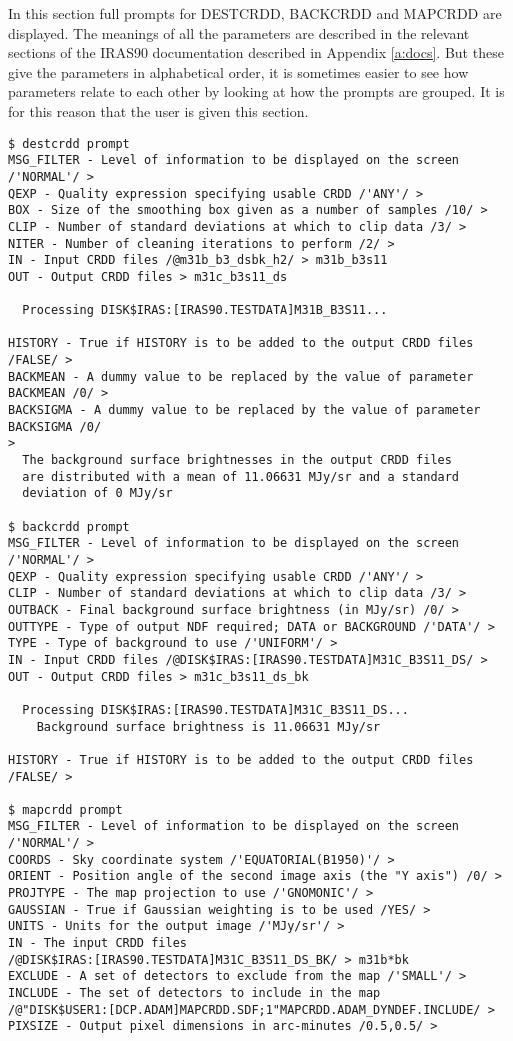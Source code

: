 \documentclass[twoside,11pt]{article}
\begin{document}
In this section full prompts for DESTCRDD, BACKCRDD and MAPCRDD are displayed.
The meanings of all the parameters are described in the relevant sections of
the IRAS90 documentation described in Appendix \ref{a:docs}. But these give the 
parameters in alphabetical order, it is sometimes easier to see how parameters
relate to each other by looking at how the prompts are grouped. It is for this 
reason that the user is given this section.
\begin{small}
\begin{verbatim}
$ destcrdd prompt
MSG_FILTER - Level of information to be displayed on the screen /'NORMAL'/ > 
QEXP - Quality expression specifying usable CRDD /'ANY'/ > 
BOX - Size of the smoothing box given as a number of samples /10/ > 
CLIP - Number of standard deviations at which to clip data /3/ > 
NITER - Number of cleaning iterations to perform /2/ > 
IN - Input CRDD files /@m31b_b3_dsbk_h2/ > m31b_b3s11
OUT - Output CRDD files > m31c_b3s11_ds

  Processing DISK$IRAS:[IRAS90.TESTDATA]M31B_B3S11...

HISTORY - True if HISTORY is to be added to the output CRDD files /FALSE/ > 
BACKMEAN - A dummy value to be replaced by the value of parameter BACKMEAN /0/ >
BACKSIGMA - A dummy value to be replaced by the value of parameter BACKSIGMA /0/
> 
  The background surface brightnesses in the output CRDD files
  are distributed with a mean of 11.06631 MJy/sr and a standard
  deviation of 0 MJy/sr

$ backcrdd prompt
MSG_FILTER - Level of information to be displayed on the screen /'NORMAL'/ > 
QEXP - Quality expression specifying usable CRDD /'ANY'/ > 
CLIP - Number of standard deviations at which to clip data /3/ > 
OUTBACK - Final background surface brightness (in MJy/sr) /0/ > 
OUTTYPE - Type of output NDF required; DATA or BACKGROUND /'DATA'/ > 
TYPE - Type of background to use /'UNIFORM'/ > 
IN - Input CRDD files /@DISK$IRAS:[IRAS90.TESTDATA]M31C_B3S11_DS/ >
OUT - Output CRDD files > m31c_b3s11_ds_bk

  Processing DISK$IRAS:[IRAS90.TESTDATA]M31C_B3S11_DS...
    Background surface brightness is 11.06631 MJy/sr

HISTORY - True if HISTORY is to be added to the output CRDD files /FALSE/ > 

$ mapcrdd prompt
MSG_FILTER - Level of information to be displayed on the screen /'NORMAL'/ > 
COORDS - Sky coordinate system /'EQUATORIAL(B1950)'/ > 
ORIENT - Position angle of the second image axis (the "Y axis") /0/ > 
PROJTYPE - The map projection to use /'GNOMONIC'/ > 
GAUSSIAN - True if Gaussian weighting is to be used /YES/ >
UNITS - Units for the output image /'MJy/sr'/ > 
IN - The input CRDD files
/@DISK$IRAS:[IRAS90.TESTDATA]M31C_B3S11_DS_BK/ > m31b*bk
EXCLUDE - A set of detectors to exclude from the map /'SMALL'/ > 
INCLUDE - The set of detectors to include in the map
/@"DISK$USER1:[DCP.ADAM]MAPCRDD.SDF;1"MAPCRDD.ADAM_DYNDEF.INCLUDE/ >
PIXSIZE - Output pixel dimensions in arc-minutes /0.5,0.5/ > 


\end{verbatim}
\end{small}
\end{document}
